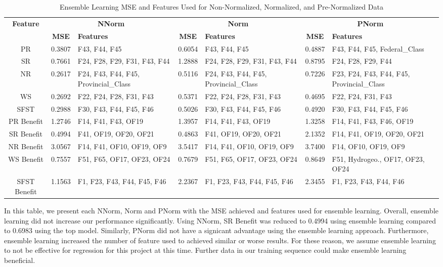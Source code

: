 \documentclass[12pt,letterpaper]{article}
\begin{document}
\begin{table}
\centering
\begin{tabular}{|c||c|p{2.5cm}||c|p{2.5cm}||c|p{2.5cm}|}
\hline
\multirow{2}{*}{\textbf{Feature}} & \multicolumn{2}{c||}{\textbf{NNorm}} & \multicolumn{2}{c||}{\textbf{Norm}} & \multicolumn{2}{c|}{\textbf{PNorm}} \\
\cline{2-7}
 & \textbf{MSE} & \textbf{Features} & \textbf{MSE} & \textbf{Features} & \textbf{MSE} & \textbf{Features} \\
\hline
PR & 0.3807 & F43, F44, F45 & 0.6054 & F43, F44, F45 & 0.4887 & F43, F44, F45, Federal\_Class \\
\hline
SR & 0.7661 & F24, F28, F29, F31, F43, F44 & 1.2888 & F24, F28, F29, F31, F43, F44 & 0.8795 & F24, F28, F29, F44 \\
\hline
NR & 0.2617 & F24, F43, F44, F45, Provincial\_Class & 0.5116 & F24, F43, F44, F45, Provincial\_Class & 0.7226 & F23, F24, F43, F44, F45, Provincial\_Class \\
\hline
WS & 0.2692 & F22, F24, F28, F31, F43 & 0.5371 & F22, F24, F28, F31, F43 & 0.4695 & F22, F24, F31, F43 \\
\hline
SFST & 0.2988 & F30, F43, F44, F45, F46 & 0.5026 & F30, F43, F44, F45, F46 & 0.4920 & F30, F43, F44, F45, F46 \\
\hline
PR Benefit & 1.2746 & F14, F41, F43, OF19 & 1.3957 & F14, F41, F43, OF19 & 1.3258 & F14, F41, F43, F46, OF19 \\
\hline
SR Benefit & 0.4994 & F41, OF19, OF20, OF21 & 0.4863 & F41, OF19, OF20, OF21 & 2.1352 & F14, F41, OF19, OF20, OF21 \\
\hline
NR Benefit & 3.0567 & F14, F41, OF10, OF19, OF9 & 3.5417 & F14, F41, OF10, OF19, OF9 & 3.7400 & F14, OF10, OF19, OF9 \\
\hline
WS Benefit & 0.7557 & F51, F65, OF17, OF23, OF24 & 0.7679 & F51, F65, OF17, OF23, OF24 & 0.8649 & F51, Hydrogeo., OF17, OF23, OF24 \\
\hline
SFST Benefit & 1.1563 & F1, F23, F43, F44, F45, F46 & 2.2367 & F1, F23, F43, F44, F45, F46 & 2.3455 & F1, F23, F43, F44, F46 \\
\hline
\end{tabular}
\caption{Ensemble Learning MSE and Features Used for Non-Normalized, Normalized, and Pre-Normalized Data}
\label{reg_all_tab:summary_mse_features}
\end{table}



In this table, we present each NNorm, Norm and PNorm with the MSE achieved and features used for ensemble learning.
Overall, ensemble learning did not increase our performance significantly.
Using NNorm, \ac{SR} Benefit was reduced to 0.4994 using ensemble learning compared to 0.6983 using the top model.
Similarly, PNorm did not have a signicant advantage using the ensemble learning approach.
Furthermore, ensemble learning increased the number of feature used to achieved similar or worse results.
For these reason, we assume ensemble learning to not be effective for regression for this project at this time.
Further data in our training sequence could make ensemble learning beneficial.
\end{document}
